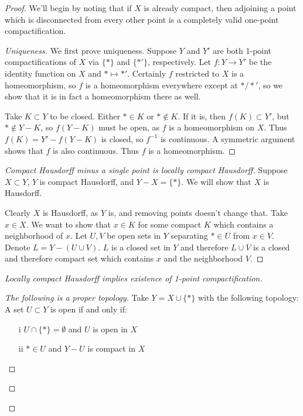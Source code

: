\begin{proof}
	
	We'll begin by noting that if $X$ is already compact, then adjoining a point which is disconnected from every other point is a completely valid one-point compactification.
	
	\begin{proof}[Uniqueness]
		
	We first prove uniqueness.  Suppose $Y$ and $Y'$ are both 1-point compactifications of $X$ via $\{\ast\}$ and $\{\ast'\}$, respectively.  Let $f:Y\rightarrow Y'$ be the identity function on $X$ and $\ast\mapsto\ast'$.  Certainly $f$ restricted to $X$ is a homeomorphism, so $f$ is a homeomorphism everywhere except at $\ast/\ast'$, so we show that it is in fact a homeomorphism there as well.
	
	Take $K\subset Y$ to be closed.  Either $\ast\in K$ or $\ast\notin K$.  If it is, then $f(K)\subset Y'$, but $\ast\notin Y{-}K$, so $f(Y-K)$ must be open, as $f$ is a homeomorphism on $X$.  Thus $f(K)=Y'{-}f(Y{-}K)$ is closed, so $f^{-1}$ is continuous.  A symmetric argument shows that $f$ is also continuous.  Thus $f$ is a homeomorphism.
	\end{proof}
	
	\begin{proof}[Compact Hausdorff minus a single point is locally compact Hausdorff]
		
	Suppose $X\subset Y$, $Y$ is compact Hausdorff, and $Y{-}X=\{\ast\}$.  We will show that $X$ is Hausdorff.
	
	Clearly $X$ is Hausdorff, as $Y$ is, and removing points doesn't change that.  Take $x\in X$.  We want to show that $x\in K$ for some compact $K$ which contains a neighborhood of $x$.  Let $U,V$ be open sets in $Y$ separating $\ast\in U$ from $x\in V$.  Denote $L=Y{-}(U\cup V)$.  $L$ is a closed set in $Y$ and therefore $L\cup\overline{V}$ is a closed and therefore compact set which contains $x$ and the neighborhood $V$.
		
		
		
	\end{proof}
	\begin{proof}[Locally compact Hausdorff implies existence of 1-point compactification]
		
		
		
		
		
		\begin{proof}[The following is a proper topology]
		Take $Y=X\cup\{\ast\}$ with the following topology:
		A set $U\subset Y$ is open if and only if:
		\begin{enumerate}
			\item[i] $U\cap\{\ast\} = \emptyset$ and $U$ is open in $X$
			\item[ii] $\ast\in U$ and $Y{-}U$ is compact in $X$
			

\end{enumerate}
\end{proof}
\end{proof}
\end{proof}
